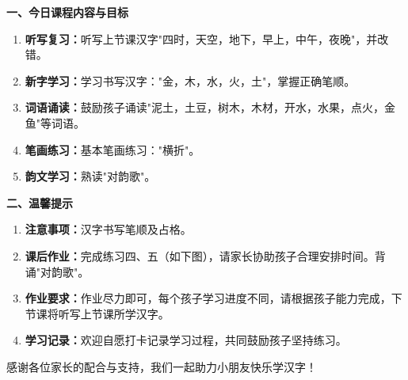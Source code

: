 \documentclass[a4paper, 14pt]{article}
\begin{document}

\begin{hanzibox}
\par
\textbf{一、今日课程内容与目标}

\begin{enumerate}
\item \textbf{听写复习：}听写上节课汉字"四时，天空，地下，早上，中午，夜晚"，并改错。

\item \textbf{新字学习：}学习书写汉字："金，木，水，火，土"，掌握正确笔顺。

\item \textbf{词语诵读：}鼓励孩子诵读"泥土，土豆，树木，木材，开水，水果，点火，金鱼"等词语。

\item \textbf{笔画练习：}基本笔画练习："横折"。

\item \textbf{韵文学习：}熟读"对韵歌"。
\end{enumerate}

\textbf{二、温馨提示}

\begin{enumerate}
\item \textbf{注意事项：}汉字书写笔顺及占格。

\item \textbf{课后作业：}完成练习四、五（如下图），请家长协助孩子合理安排时间。背诵"对韵歌"。

\item \textbf{作业要求：}作业尽力即可，每个孩子学习进度不同，请根据孩子能力完成，下节课将听写上节课所学汉字。

\item \textbf{学习记录：}欢迎自愿打卡记录学习过程，共同鼓励孩子坚持练习。
\end{enumerate}

感谢各位家长的配合与支持，我们一起助力小朋友快乐学汉字！

\end{hanzibox}
\end{document}
